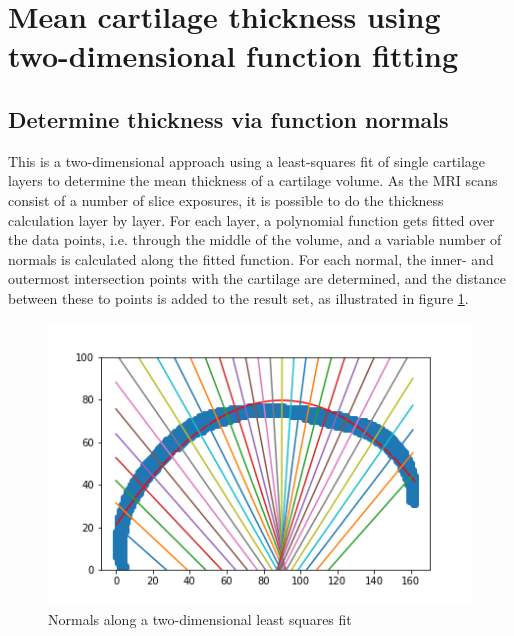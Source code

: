 \section{Mean cartilage thickness using two-dimensional function fitting}
\label{sec:Function_fitting}
\subsection{Determine thickness via function normals}
\label{sec:Normals}
This is a two-dimensional approach using a least-squares fit of single cartilage layers to determine the mean thickness of a cartilage volume. As the MRI scans consist of a number of slice exposures, it is possible to do the thickness calculation layer by layer. For each layer, a polynomial function gets fitted over the data points, i.e. through the middle of the volume, and a variable number of normals is calculated along the fitted function. For each normal, the inner- and outermost intersection points with the cartilage are determined, and the distance between these to points is added to the result set, as illustrated in figure \ref{fig:normals}.
\begin{figure}[htb!]
	\centering
	\includegraphics[width=\linewidth]{./figures/normals}
	\caption{Normals along a two-dimensional least squares fit}
	\label{fig:normals}
\end{figure} 

